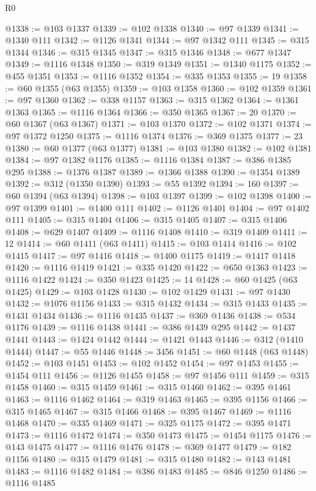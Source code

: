 \begin{lexlean}{R0}
\begin{coremodule}
@1338 := @103 @1337
@1339 := @102 @1338
@1340 := @97 @1339
@1341 := @1340 @111
@1342 := @1126 @1341
@1344 := @97 @1342 @111
@1345 := @315 @1344
@1346 := @315 @1345
@1347 := @315 @1346
@1348 := @677 @1347
@1349 := @1116 @1348
@1350 := @319 @1349
@1351 := @1340 @1175
@1352 := @455 @1351
@1353 := @1116 @1352
@1354 := @335 @1353
@1355 := 19
@1358 := @60 @1355 (@63 @1355)
@1359 := @103 @1358
@1360 := @102 @1359
@1361 := @97 @1360
@1362 := @338 @1157
@1363 := @315 @1362
@1364 := @1361 @1363
@1365 := @1116 @1364
@1366 := @350 @1365
@1367 := 20
@1370 := @60 @1367 (@63 @1367)
@1371 := @103 @1370
@1372 := @102 @1371
@1374 := @97 @1372 @1250
@1375 := @1116 @1374
@1376 := @369 @1375
@1377 := 23
@1380 := @60 @1377 (@63 @1377)
@1381 := @103 @1380
@1382 := @102 @1381
@1384 := @97 @1382 @1176
@1385 := @1116 @1384
@1387 := @386 @1385 @295
@1388 := @1376 @1387
@1389 := @1366 @1388
@1390 := @1354 @1389
@1392 := @312 (@1350 @1390)
@1393 := @55 @1392
@1394 := 160
@1397 := @60 @1394 (@63 @1394)
@1398 := @103 @1397
@1399 := @102 @1398
@1400 := @97 @1399
@1401 := @1400 @111
@1402 := @1126 @1401
@1404 := @97 @1402 @111
@1405 := @315 @1404
@1406 := @315 @1405
@1407 := @315 @1406
@1408 := @629 @1407
@1409 := @1116 @1408
@1410 := @319 @1409
@1411 := 12
@1414 := @60 @1411 (@63 @1411)
@1415 := @103 @1414
@1416 := @102 @1415
@1417 := @97 @1416
@1418 := @1400 @1175
@1419 := @1417 @1418
@1420 := @1116 @1419
@1421 := @335 @1420
@1422 := @650 @1363
@1423 := @1116 @1422
@1424 := @350 @1423
@1425 := 14
@1428 := @60 @1425 (@63 @1425)
@1429 := @103 @1428
@1430 := @102 @1429
@1431 := @97 @1430
@1432 := @1076 @1156
@1433 := @315 @1432
@1434 := @315 @1433
@1435 := @1431 @1434
@1436 := @1116 @1435
@1437 := @369 @1436
@1438 := @534 @1176
@1439 := @1116 @1438
@1441 := @386 @1439 @295
@1442 := @1437 @1441
@1443 := @1424 @1442
@1444 := @1421 @1443
@1446 := @312 (@1410 @1444)
@1447 := @55 @1446
@1448 := 3456
@1451 := @60 @1448 (@63 @1448)
@1452 := @103 @1451
@1453 := @102 @1452
@1454 := @97 @1453
@1455 := @1454 @111
@1456 := @1126 @1455
@1458 := @97 @1456 @111
@1459 := @315 @1458
@1460 := @315 @1459
@1461 := @315 @1460
@1462 := @395 @1461
@1463 := @1116 @1462
@1464 := @319 @1463
@1465 := @395 @1156
@1466 := @315 @1465
@1467 := @315 @1466
@1468 := @395 @1467
@1469 := @1116 @1468
@1470 := @335 @1469
@1471 := @325 @1175
@1472 := @395 @1471
@1473 := @1116 @1472
@1474 := @350 @1473
@1475 := @1454 @1175
@1476 := @143 @1475
@1477 := @1116 @1476
@1478 := @369 @1477
@1479 := @182 @1156
@1480 := @315 @1479
@1481 := @315 @1480
@1482 := @143 @1481
@1483 := @1116 @1482
@1484 := @386 @1483
@1485 := @846 @1250
@1486 := @1116 @1485

\end{coremodule}
\end{lexlean}
